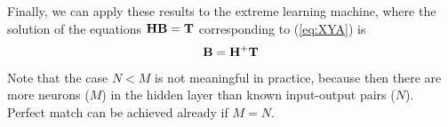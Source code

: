\begin{enumerate}
\begin{solution}
    Finally, we can apply these results to the extreme learning machine, where the solution
    of the equations ${\bf HB} = {\bf T}$ corresponding to (\ref{eq:XYA}) is
    \begin{equation}
      {\bf B} = {\bf H}^+{\bf T}
      \label{eq:B}
    \end{equation}
    Note that the case $N < M$ is not meaningful in practice, because then there are
    more neurons ($M$) in the hidden layer than known input-output pairs ($N$). Perfect
    match can be achieved already if $M = N$.




  \end{solution}
  

  


  
\end{enumerate}

